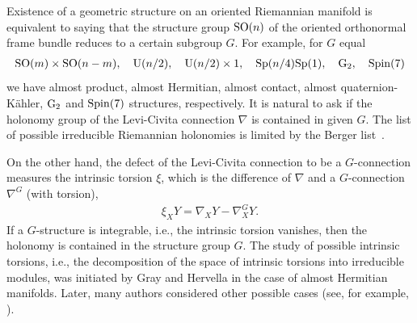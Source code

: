 \documentclass[pdftex]{sigma}
\numberwithin{equation}{section}
\begin{document}
Existence of a geometric structure on an oriented Riemannian manifold is equivalent to saying that the structure group ${\rm SO}(n)$ of the oriented orthonormal frame bundle reduces to a certain subgroup $G$. For example, for $G$ equal
\begin{gather*}
{\rm SO}(m)\times {\rm SO}(n-m),\quad {\rm U}(n/2),\quad {\rm U}(n/2)\times 1,\quad {\rm Sp}(n/4){\rm Sp}(1),\quad {\rm G}_2,\quad {\rm Spin}(7)
\end{gather*}
we have almost product, almost Hermitian, almost contact, almost quaternion-K\"ahler, ${\rm G}_2$ and ${\rm Spin}(7)$ structures, respectively. It is natural to ask if the holonomy group of the Levi-Civita connection $\nabla$ is contained in given $G$. The list of possible irreducible Riemannian holonomies is limited by the Berger list~\cite{lb}.

On the other hand, the defect of the Levi-Civita connection to be a $G$-connection measures the intrinsic torsion $\xi$, which is the dif\/ference of $\nabla$ and a $G$-connection $\nabla^G$ (with torsion),
\begin{gather*}
\xi_XY=\nabla_XY-\nabla^G_XY.
\end{gather*}
If a $G$-structure is integrable, i.e., the intrinsic torsion vanishes, then the holonomy is contained in the structure group $G$. The study of possible intrinsic torsions, i.e., the decomposition of the space of intrinsic torsions into irreducible modules, was initiated by Gray and Hervella \cite{gh} in the case of almost Hermitian manifolds. Later, many authors considered other possible cases (see, for example, \cite{cg,chs,cs,dm,ffs,fg,mc,ms,an,vw}).
\end{document}
